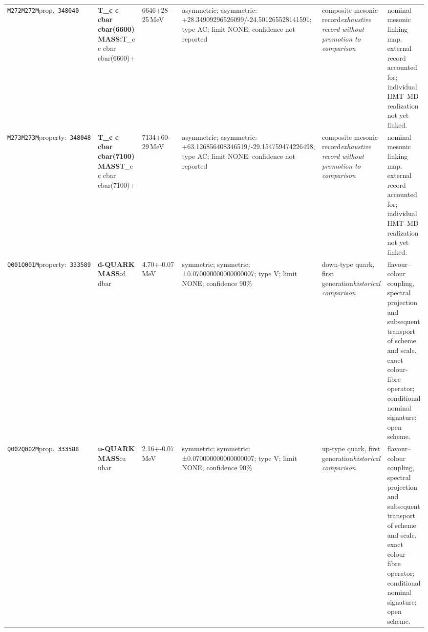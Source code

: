 \begin{landscape}
\begin{longtable}{L{1.85cm}L{4.45cm}L{2.35cm}L{4.05cm}L{3.35cm}L{7.15cm}}
\texttt{M272}\newline \texttt{M272M}\newline prop.\ \texttt{348040} & \textbf{T\_\allowbreak{}c c cbar cbar(6600) MASS:}\newline T\_\allowbreak{}c c cbar cbar(6600)+ & 6646+28-25\,MeV & asymmetric; asymmetric: +28.34909296526099/-24.501265528141591; type AC; limit NONE; confidence not reported & composite mesonic record\newline \emph{exhaustive record without promotion to comparison} & nominal mesonic linking map. external record accounted for; individual HMT--MD realization not yet linked. \\
\texttt{M273}\newline \texttt{M273M}\newline property:\ \texttt{348048} & \textbf{T\_\allowbreak{}c c cbar cbar(7100) MASS}\newline T\_\allowbreak{}c c cbar cbar(7100)+ & 7134+60-29\,MeV & asymmetric; asymmetric: +63.126856408346519/-29.154759474226498; type AC; limit NONE; confidence not reported & composite mesonic record\newline \emph{exhaustive record without promotion to comparison} & nominal mesonic linking map. external record accounted for; individual HMT--MD realization not yet linked. \\
\texttt{Q001}\newline \texttt{Q001M}\newline property:\ \texttt{333589} & \textbf{d-QUARK MASS:}\newline d \textbar{}\allowbreak{} dbar & 4.70+-0.07\,MeV & symmetric; symmetric: ±0.070000000000000007; type V; limit NONE; confidence 90\% & down-type quark, first generation\newline \emph{historical comparison} & flavour--colour coupling, spectral projection and subsequent transport of scheme and scale. exact colour-fibre operator; conditional nominal signature; open scheme. \\
\texttt{Q002}\newline \texttt{Q002M}\newline prop.\ \texttt{333588} & \textbf{u-QUARK MASS:}\newline u \textbar{}\allowbreak{} ubar & 2.16+-0.07\,MeV & symmetric; symmetric: ±0.070000000000000007; type V; limit NONE; confidence 90\% & up-type quark, first generation\newline \emph{historical comparison} & flavour--colour coupling, spectral projection and subsequent transport of scheme and scale. exact colour-fibre operator; conditional nominal signature; open scheme. \\

\end{longtable}
\end{landscape}
